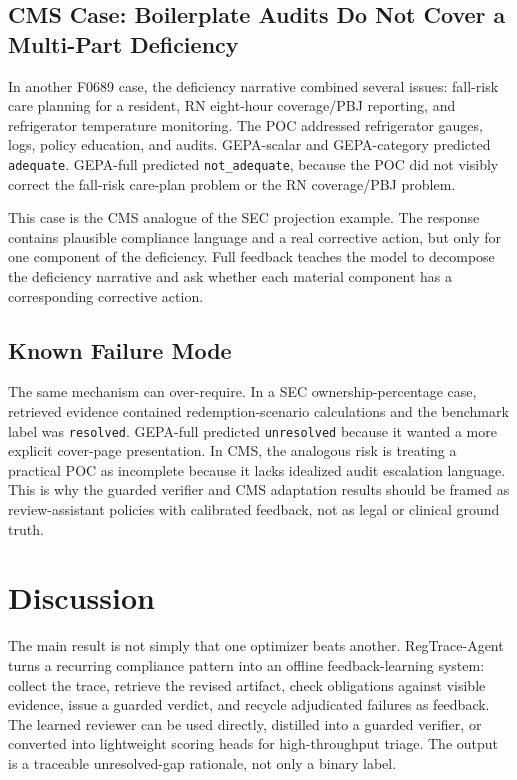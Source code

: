 \documentclass[11pt]{article}
\newcommand{\framework}{RegTrace-Agent}
\begin{document}
\subsection{CMS Case: Boilerplate Audits Do Not Cover a Multi-Part Deficiency}

In another F0689 case, the deficiency narrative combined several issues: fall-risk care planning for a resident, RN eight-hour coverage/PBJ reporting, and refrigerator temperature monitoring. The POC addressed refrigerator gauges, logs, policy education, and audits. GEPA-scalar and GEPA-category predicted \texttt{adequate}. GEPA-full predicted \texttt{not\_adequate}, because the POC did not visibly correct the fall-risk care-plan problem or the RN coverage/PBJ problem.

This case is the CMS analogue of the SEC projection example. The response contains plausible compliance language and a real corrective action, but only for one component of the deficiency. Full feedback teaches the model to decompose the deficiency narrative and ask whether each material component has a corresponding corrective action.

\subsection{Known Failure Mode}

The same mechanism can over-require. In a SEC ownership-percentage case, retrieved evidence contained redemption-scenario calculations and the benchmark label was \texttt{resolved}. GEPA-full predicted \texttt{unresolved} because it wanted a more explicit cover-page presentation. In CMS, the analogous risk is treating a practical POC as incomplete because it lacks idealized audit escalation language. This is why the guarded verifier and CMS adaptation results should be framed as review-assistant policies with calibrated feedback, not as legal or clinical ground truth.

\section{Discussion}

The main result is not simply that one optimizer beats another. \framework{} turns a recurring compliance pattern into an offline feedback-learning system: collect the trace, retrieve the revised artifact, check obligations against visible evidence, issue a guarded verdict, and recycle adjudicated failures as feedback. The learned reviewer can be used directly, distilled into a guarded verifier, or converted into lightweight scoring heads for high-throughput triage. The output is a traceable unresolved-gap rationale, not only a binary label.
\end{document}
